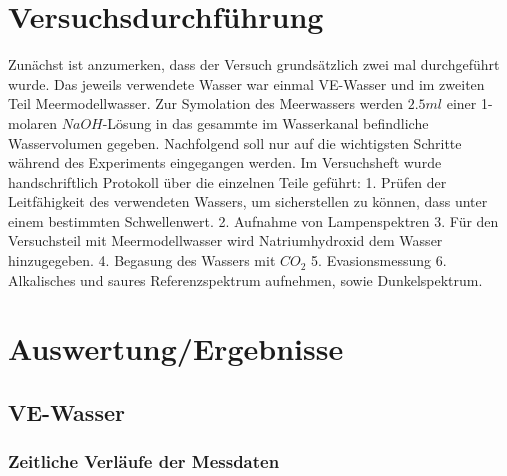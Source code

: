 \documentclass[12pt]{article}
\begin{document}
\section{Versuchsdurchf\"uhrung}

Zunächst ist anzumerken, dass der Versuch grundsätzlich zwei mal durchgeführt wurde. Das jeweils verwendete Wasser war einmal VE-Wasser und im zweiten Teil Meermodellwasser. Zur Symolation des Meerwassers werden $2.5ml$ einer 1-molaren $NaOH$-Lösung in das gesammte im Wasserkanal befindliche Wasservolumen gegeben.
Nachfolgend soll nur auf die wichtigsten Schritte während des Experiments eingegangen werden. Im Versuchsheft wurde handschriftlich Protokoll über die einzelnen Teile geführt:
1. Prüfen der Leitfähigkeit des verwendeten Wassers, um sicherstellen zu können, dass unter einem bestimmten Schwellenwert. 2. Aufnahme von Lampenspektren 3. Für den Versuchsteil mit Meermodellwasser wird Natriumhydroxid dem Wasser hinzugegeben. 4. Begasung des Wassers mit $CO_2$ 5. Evasionsmessung 6. Alkalisches und saures Referenzspektrum aufnehmen, sowie Dunkelspektrum.

\section{Auswertung/Ergebnisse}
\subsection{VE-Wasser}
\subsubsection{Zeitliche Verl\"aufe der Messdaten}
\end{document}
